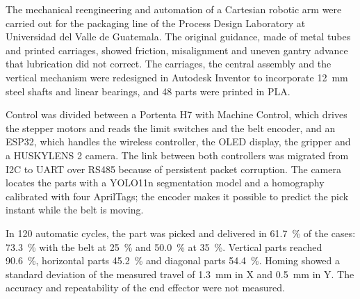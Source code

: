 The mechanical reengineering and automation of a Cartesian robotic arm were carried out for the packaging line of the Process Design Laboratory at Universidad del Valle de Guatemala. The original guidance, made of metal tubes and printed carriages, showed friction, misalignment and uneven gantry advance that lubrication did not correct. The carriages, the central assembly and the vertical mechanism were redesigned in Autodesk Inventor to incorporate 12~mm steel shafts and linear bearings, and 48 parts were printed in PLA.

Control was divided between a Portenta H7 with Machine Control, which drives the stepper motors and reads the limit switches and the belt encoder, and an ESP32, which handles the wireless controller, the OLED display, the gripper and a HUSKYLENS 2 camera. The link between both controllers was migrated from I2C to UART over RS485 because of persistent packet corruption. The camera locates the parts with a YOLO11n segmentation model and a homography calibrated with four AprilTags; the encoder makes it possible to predict the pick instant while the belt is moving.

In 120 automatic cycles, the part was picked and delivered in 61.7~\% of the cases: 73.3~\% with the belt at 25~\% and 50.0~\% at 35~\%. Vertical parts reached 90.6~\%, horizontal parts 45.2~\% and diagonal parts 54.4~\%. Homing showed a standard deviation of the measured travel of 1.3~mm in X and 0.5~mm in Y. The accuracy and repeatability of the end effector were not measured.
